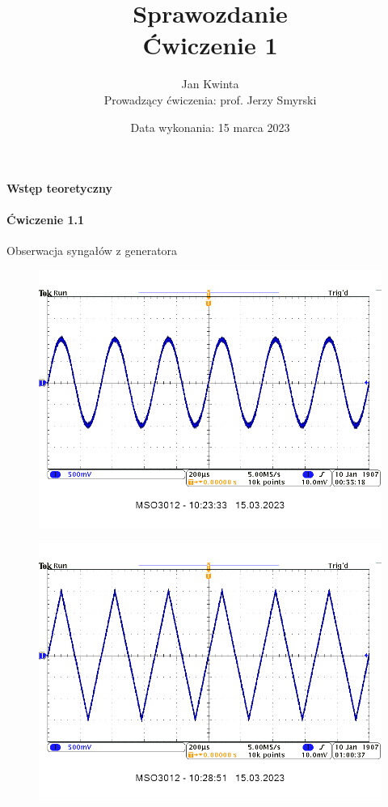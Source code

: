 \documentclass[14pt, table]{extarticle}
\title{\textbf{Sprawozdanie} \\ \Large{Ćwiczenie 1}}
\date{Data wykonania: 15 marca 2023}
\author{ \Large{Jan Kwinta} \\ \large{Prowadzący ćwiczenia: prof. Jerzy Smyrski}}
\begin{document}
\maketitle

\paragraph{Wstęp teoretyczny}

\paragraph{Ćwiczenie 1.1 \\}
Obserwacja syngałów z generatora
\begin{figure}[H]
\includegraphics[scale=0.7]{A18}
\centering
\end{figure}

\begin{figure}[H]
\includegraphics[scale=0.7]{A20}
\centering
\end{figure}
\end{document}
